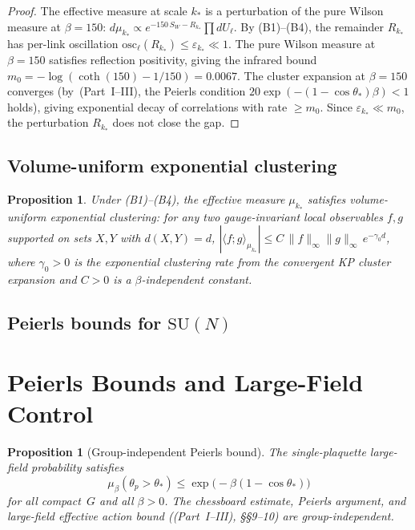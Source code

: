 \documentclass[11pt]{article}
\newtheorem{proposition}[theorem]{Proposition}
\theoremstyle{definition}
\newcommand{\SU}{\mathrm{SU}}
\newcommand{\osc}{\mathrm{osc}}
\begin{document}
\begin{proof}
The effective measure at scale $k_*$ is a perturbation
of the pure Wilson measure at $\beta = 150$:
$d\mu_{k_*} \propto e^{-150\,S_W - R_{k_*}}\prod dU_\ell$.
By (B1)--(B4), the remainder $R_{k_*}$ has per-link
oscillation $\osc_\ell(R_{k_*}) \leq \varepsilon_{k_*}
\ll 1$.  The pure Wilson measure at $\beta = 150$
satisfies reflection positivity, giving the infrared
bound $m_0 = -\log(\coth(150) - 1/150) = 0.0067$.
The cluster expansion at $\beta = 150$ converges
(by~(Part~I--III), the Peierls condition
$20\exp(-(1-\cos\theta_*)\beta) < 1$ holds), giving
exponential decay of correlations with rate $\geq m_0$.
Since $\varepsilon_{k_*} \ll m_0$, the perturbation
$R_{k_*}$ does not close the gap.
\end{proof}

\subsection{Volume-uniform exponential clustering}

\begin{proposition}\label{syn-prop:mixing}
Under (B1)--(B4), the effective measure
$\mu_{k_*}$ satisfies volume-uniform exponential clustering:
for any two gauge-invariant local observables $f,g$ supported
on sets $X,Y$ with $d(X,Y)=d$,
$|\langle f;g\rangle_{\mu_{k_*}}|
\le C\,\|f\|_\infty\|g\|_\infty\,e^{-\gamma_0 d}$,
where $\gamma_0>0$ is the exponential clustering rate from
the convergent KP cluster expansion and $C>0$ is a
$\beta$-independent constant.
\end{proposition}


\subsection{Peierls bounds for $\SU(N)$}

\section{Peierls Bounds and Large-Field Control}
\label{sun-sec:peierls}

\begin{proposition}[Group-independent Peierls bound]
\label{sun-prop:peierls}
The single-plaquette large-field probability satisfies
\begin{equation}
\mu_\beta(\theta_p>\theta_*)
\le\exp\bigl(-\beta(1-\cos\theta_*)\bigr)
\end{equation}
for all compact~$G$ and all $\beta>0$.
The chessboard estimate, Peierls argument, and
large-field effective action bound
(\textup{(Part~I--III)}, \S\S9--10) are
group-independent.
\end{proposition}
\end{document}
